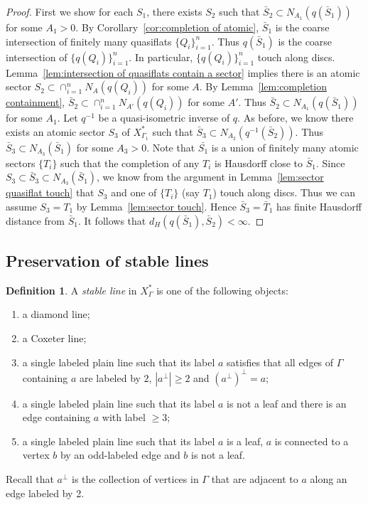 \documentclass[11pt]{amsart}
\theoremstyle{definition}
\newtheorem{definition}[theorem]{Definition}
\newcommand{\Xa}{X^{\ast}}
\begin{document}
\begin{proof}
First we show for each $S_1$, there exists $S_2$ such that $\bar S_2\subset N_{A_1}(q(\bar S_1))$ for some $A_1>0$. By Corollary~\ref{cor:completion of atomic}, $\bar{S}_1$ is the coarse intersection of finitely many quasiflats $\{Q_i\}_{i=1}^n$. Thus $q(\bar S_1)$ is the coarse intersection of $\{q(Q_i)\}_{i=1}^n$. In particular, $\{q(Q_i)\}_{i=1}^n$ touch along discs. Lemma~\ref{lem:intersection of quasiflats contain a sector} implies there is an atomic sector $S_2\subset\cap_{i=1}^n N_A(q(Q_i))$ for some $A$. By Lemma~\ref{lem:completion containment}, $\bar S_2\subset\cap_{i=1}^n N_{A'}(q(Q_i))$ for some $A'$. Thus $\bar S_2\subset N_{A_1}(q(\bar S_1))$ for some $A_1$. Let $q^{-1}$ be a quasi-isometric inverse of $q$. As before, we know there exists an atomic sector $S_3$ of $\Xa_{\Gamma_1}$ such that $\bar S_3\subset N_{A_2}(q^{-1}(\bar S_2))$. Thus $\bar S_3\subset N_{A_3}(\bar S_1)$ for some $A_3>0$. Note that $\bar{S_1}$ is a union of finitely many atomic sectors $\{T_i\}$ such that the completion of any $T_i$ is Hausdorff close to $\bar{S}_1$. Since $S_3\subset\bar{S}_3\subset N_{A_3}(\bar S_1)$, we know from the argument in Lemma~\ref{lem:sector quasiflat touch} that $S_3$ and one of $\{T_i\}$ (say $T_1$) touch along discs. Thus we can assume $S_3=T_1$ by Lemma~\ref{lem:sector touch}. Hence $\bar S_3=\bar T_1$ has finite Hausdorff distance from $\bar S_1$. It follows that $d_H(q(\bar S_1),\bar S_2)<\infty$.
\end{proof}

\subsection{Preservation of stable lines}
\begin{definition}
	\label{def:stable line}
A \emph{stable line} in $\Xa_\Gamma$ is one of the following objects:
\begin{enumerate}
	\item a diamond line;
	\item a Coxeter line;
	\item a single labeled plain line such that its label $a$ satisfies that all edges of $\Gamma$ containing $a$ are labeled by $2$, $|a^{\perp}|\ge 2$ and $(a^{\perp})^{\perp}=a$;
	\item a single labeled plain line such that its label $a$ is not a leaf and there is an edge containing $a$ with label $\ge 3$;
	\item a single labeled plain line such that its label $a$ is a leaf, $a$ is connected to a vertex $b$ by an odd-labeled edge and $b$ is not a leaf.
\end{enumerate}
\end{definition}
Recall that $a^{\perp}$ is the collection of vertices in $\Gamma$ that are adjacent to $a$ along an edge labeled by 2.
\end{document}
